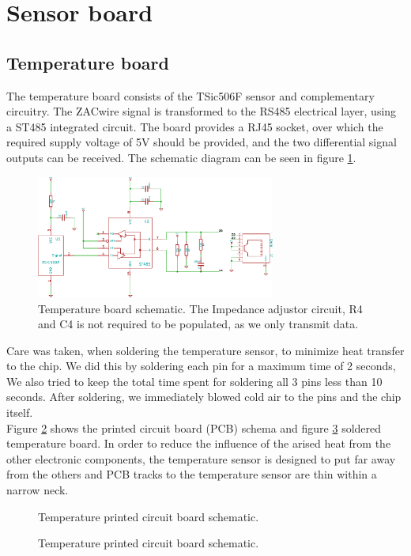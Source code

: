 \documentclass[a4paper]{scrreprt}
\begin{document}
\section{Sensor board} \label{chap:sensorbrd}
\subsection{Temperature board} \label{chap:tempbrd}
The temperature board consists of the TSic506F sensor and
complementary circuitry. The ZACwire signal is transformed to the
RS485 electrical layer, using a ST485 integrated circuit. The board
provides a RJ45 socket,  over which the required supply voltage of 5V
should be provided, and the two differential signal outputs can be
received. The schematic diagram can be seen in figure
\ref{fig:schem_temp}.\\
\begin{figure}[Hh!]
	\centering
	\includegraphics[width=0.7\textwidth]{img/schem_temperature_board.pdf}
	\caption{Temperature board schematic. The Impedance adjustor circuit, R4 and C4 is not required to be populated, as we only transmit data.}
	\label{fig:schem_temp}
\end{figure}
Care was taken, when soldering the temperature sensor, to minimize
heat transfer to the chip. We did this by soldering each pin for a
maximum time of 2 seconds, We also tried to keep the total time spent
for soldering all 3 pins less than 10 seconds. After soldering, we
immediately blowed cold air to the pins and the chip itself.\\
Figure \ref{fig:pcb_temp} shows the printed circuit board (PCB) schema and figure \ref{fig:soldered_temp} soldered temperature board. 
In order to reduce the influence of the arised heat from the other electronic components, the temperature sensor is designed to put far away from the others and PCB tracks to the temperature sensor are thin within a narrow neck.
\begin{figure}[Hh!]
	\centering
	\caption{Temperature printed circuit board schematic.}
	\label{fig:pcb_temp}
\end{figure}
\begin{figure}[Hh!]
	\centering
	\caption{Temperature printed circuit board schematic.}
	\label{fig:soldered_temp}
\end{figure}
\end{document}
